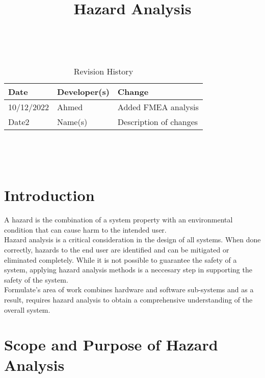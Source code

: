 \documentclass{article}
\title{Hazard Analysis\\\progname}
\author{\authname}
\date{}
\begin{document}
\maketitle
\thispagestyle{empty}

~\newpage


\begin{table}[hp]
\caption{Revision History} \label{TblRevisionHistory}
\begin{tabularx}{\textwidth}{llX}
\toprule
\textbf{Date} & \textbf{Developer(s)} & \textbf{Change}\\
\midrule
10/12/2022 & Ahmed & Added FMEA analysis\\
Date2 & Name(s) & Description of changes\\
\bottomrule
\end{tabularx}
\end{table}

~\newpage

\tableofcontents

~\newpage



\section{Introduction}

A hazard is the combination of a system property with an environmental condition that can cause harm to the intended user.\\

Hazard analysis is a critical consideration in the design of all systems. When done correctly, hazards to the end user are identified and can be mitigated or eliminated completely. While it is not possible to guarantee the safety of a system, applying hazard analysis methods is a neccesary step in supporting the safety of the system. \\

Formulate's area of work combines hardware and software sub-systems and as a result, requires hazard analysis to obtain a comprehensive understanding of the overall system. \\


\section{Scope and Purpose of Hazard Analysis}
\end{document}

